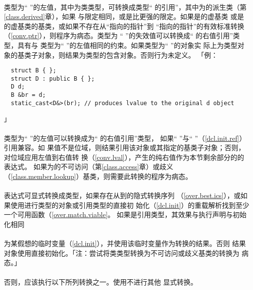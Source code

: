 \paragraph{}
类型为`` ''的左值，其中为类类型，可转换成类型``
的引用''，其中为的派生类（第\ref{class.derived}章），如果
与限定相同，或是比更强的限定。如果是的虚基类
或是的虚基类的基类，或如果不存在从``指向的指针''到
``指向的指针''的有效标准转换（\ref{conv.ptr}），则程序为病态。类型为
`` ''的失效值可以转换成`` 的右值引用''类型，具有与
类型为`` ''的左值相同的约束。如果类型为`` ''的对象实
际上为类型对象的基类子对象，则结果为类型的包含对象。否则行为未定义。
「例：
\begin{lstlisting}
  struct B { };
  struct D : public B { };
  D d;
  B &br = d;
  static_cast<D&>(br); // produces lvalue to the original d object
\end{lstlisting}」

\paragraph{}
类型为`` ''的左值可以转换成为`` 的右值引用''类型，
如果`` ''与`` ''（\ref{dcl.init.ref}）引用兼容。如
果值不是位域，则结果引用该对象或其指定的基类子对象；否则，对位域应用左值到右值转
换（\ref{conv.lval}），产生的纯右值作为本节剩余部分的的表达式。
如果为的不可访问（第\ref{class.access}章）或歧义
（\ref{class.member.lookup}）基类，则需要此转换的程序为病态。

\paragraph{}
表达式可显式转换成类型，如果存在从到的隐式转换序列
（\ref{over.best.ics}），或如果使用进行类型的对象或引用类型的直接初
始化（\ref{dcl.init}）的重载解析找到至少一个可用函数（\ref{over.match.viable}。
如果是引用类型，其效果与执行声明与初始化相同                            \\
\mbox{\qquad {}} \\
为某假想的临时变量（\ref{dcl.init}），并使用该临时变量作为转换的结果。否则
结果对象使用直接初始化。「注：尝试将类类型转换为不可访问或歧义基类的转换为
病态。」

\paragraph{}
否则，应该执行以下所列转换之一。使用不进行其他
显式转换。

